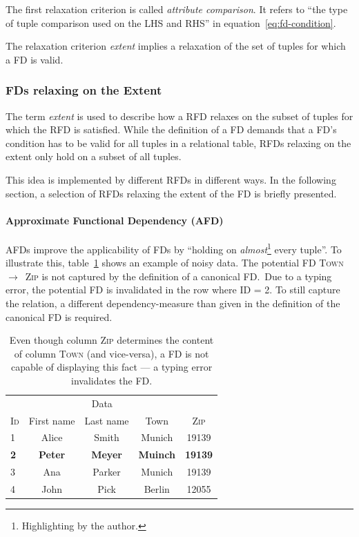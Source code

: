 The first relaxation criterion is called \emph{attribute comparison}.
It refers to ``the type of tuple comparison used on the LHS and RHS'' in equation~\ref{eq:fd-condition}.

The relaxation criterion \emph{extent} implies a relaxation of the set of tuples for which a FD is valid.

\subsubsection{FDs relaxing on the Extent}
The term \emph{extent} is used to describe how a RFD relaxes on the subset of tuples for which the RFD is satisfied.
While the definition of a FD demands that a FD's condition has to be valid for all tuples in a relational table, RFDs relaxing on the extent only hold on a subset of all tuples.

This idea is implemented by different RFDs in different ways.
In the following section, a selection of RFDs relaxing the extent of the FD is briefly presented.

\paragraph{Approximate Functional Dependency (AFD)}
AFDs improve the applicability of FDs by ``holding on \emph{almost}\footnote{Highlighting by the author.} every tuple''\cite[p.~151]{CAR16}.
To illustrate this, table~\ref{tab:example-afd-necessity} shows an example of noisy data.
The potential FD \textsc{Town}~\(\to\)~\textsc{Zip} is not captured by the definition of a canonical FD.\
Due to a typing error, the potential FD is invalidated in the row where \textsc{ID = 2}.
To still capture the relation, a different dependency-measure than given in the definition of the canonical FD is required.

\begin{table}[ht]
    \centering
    \begin{tabular}{lcccc}
        \toprule
        & \multicolumn{3}{c}{Data} \\ \cmidrule(lr){2-5}
        \textsc{Id} & First name & Last name & Town & \textsc{Zip} \\
        \midrule
        1 & Alice & Smith & Munich & 19139 \\
        \textbf{2} & \textbf{Peter}& \textbf{Meyer} &
        \textbf{Muinch} & \textbf{19139} \\
        3 & Ana & Parker & Munich & 19139  \\
        4 & John & Pick & Berlin & 12055 \\
        \bottomrule
    \end{tabular}
    \caption{Even though column \textsc{Zip} determines the content of column \textsc{Town} (and vice-versa), a FD is not capable of displaying this fact --- a typing error invalidates the FD.}
    \label{tab:example-afd-necessity}
\end{table}

